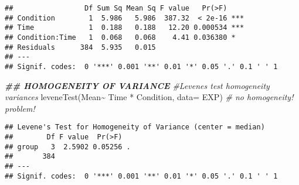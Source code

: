 \documentclass[
]{article}
\newenvironment{Shaded}{\begin{snugshade}}{\end{snugshade}}
\newcommand{\AttributeTok}[1]{\textcolor[rgb]{0.77,0.63,0.00}{#1}}
\newcommand{\CommentTok}[1]{\textcolor[rgb]{0.56,0.35,0.01}{\textit{#1}}}
\newcommand{\DocumentationTok}[1]{\textcolor[rgb]{0.56,0.35,0.01}{\textbf{\textit{#1}}}}
\newcommand{\FunctionTok}[1]{\textcolor[rgb]{0.00,0.00,0.00}{#1}}
\newcommand{\NormalTok}[1]{#1}
\newcommand{\OtherTok}[1]{\textcolor[rgb]{0.56,0.35,0.01}{#1}}
\newcommand{\SpecialCharTok}[1]{\textcolor[rgb]{0.00,0.00,0.00}{#1}}
\begin{document}
\begin{Shaded}
\end{Shaded}

\begin{verbatim}
##                 Df Sum Sq Mean Sq F value   Pr(>F)    
## Condition        1  5.986   5.986  387.32  < 2e-16 ***
## Time             1  0.188   0.188   12.20 0.000534 ***
## Condition:Time   1  0.068   0.068    4.41 0.036380 *  
## Residuals      384  5.935   0.015                     
## ---
## Signif. codes:  0 '***' 0.001 '**' 0.01 '*' 0.05 '.' 0.1 ' ' 1
\end{verbatim}

\begin{Shaded}
\begin{Highlighting}[]
\DocumentationTok{\#\# HOMOGENEITY OF VARIANCE}
\CommentTok{\#Levene\textquotesingle{}s test homogeneity variances}
\FunctionTok{leveneTest}\NormalTok{(Mean}\SpecialCharTok{\textasciitilde{}}\NormalTok{ Time }\SpecialCharTok{*}\NormalTok{ Condition, }\AttributeTok{data=}\NormalTok{ EXP) }\CommentTok{\# no homogeneity! problem! }
\end{Highlighting}
\end{Shaded}

\begin{verbatim}
## Levene's Test for Homogeneity of Variance (center = median)
##        Df F value  Pr(>F)  
## group   3  2.5902 0.05256 .
##       384                  
## ---
## Signif. codes:  0 '***' 0.001 '**' 0.01 '*' 0.05 '.' 0.1 ' ' 1
\end{verbatim}
\end{document}
